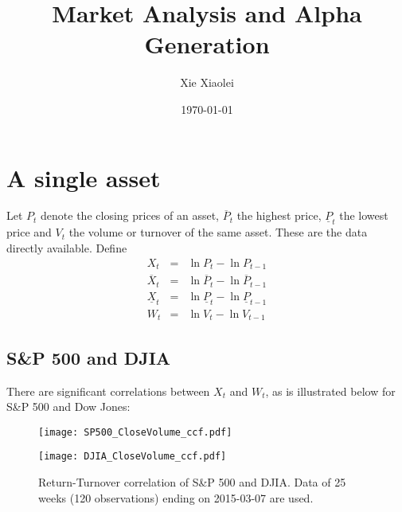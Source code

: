 \documentclass{article}
\title{Market Analysis and Alpha Generation}
\author{Xie Xiaolei}
\date{\today}
\begin{document}
\maketitle

\section{A single asset}
Let $P_t$ denote the closing prices of an asset, $\overline P_t$ the
highest price, $\underline P_t$ the lowest price and $V_t$ the volume
or turnover of the same asset. These are the data directly
available. Define
\begin{eqnarray*}
  X_t &=& \ln P_{t} - \ln P_{t-1} \\
  \overline X_t &=& \ln \overline P_{t} - \ln \overline P_{t-1} \\
  \underline X_t &=& \ln \underline P_{t} - \ln \underline P_{t-1} \\
  W_t &=& \ln V_t - \ln V_{t-1}
\end{eqnarray*}

\subsection{S\&P 500 and DJIA}
There are significant correlations between $X_t$ and $W_t$, as is
illustrated below for S\&P 500 and Dow Jones:
\begin{figure}[!htb]
\begin{minipage}{0.5\linewidth}
  \texttt{[image: SP500\_CloseVolume\_ccf.pdf]}
\end{minipage}\hfill
\begin{minipage}{0.5\linewidth}
  \texttt{[image: DJIA\_CloseVolume\_ccf.pdf]}
\end{minipage}
\caption{Return-Turnover correlation of S\&P 500 and DJIA. Data of 25
  weeks (120 observations) ending on 2015-03-07 are used.}
\end{figure}
\end{document}
